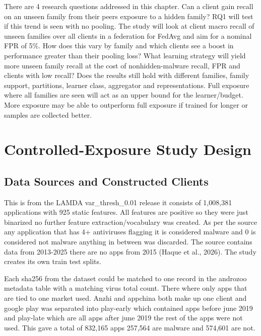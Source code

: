\documentclass[12pt,letterpaper]{article}
\begin{document}
There are 4 research questions addressed in this chapter. Can a client gain recall on an unseen family from their peers exposure to a hidden family? RQ1 will test if this trend is seen with no pooling. The study will look at client macro recall of unseen families over all clients in a federation for FedAvg and aim for a nominal FPR of 5\%. How does this vary by family and which clients see a boost in performance greater than their pooling loss? What learning strategy will yield more unseen family recall at the cost of nonhidden-malware recall, FPR and clients with low recall? Does the results still hold with different families, family support, partitions, learner class, aggregator and representations. Full exposure where all families are seen will act as an upper bound for the learner/budget. More exposure may be able to outperform full exposure if trained for longer or samples are collected better.

\section*{Controlled-Exposure Study Design}

\subsection*{Data Sources and Constructed Clients}

This is from the LAMDA var\_thresh\_0.01 release it consists of 1,008,381 applications with 925 static features. All features are positive so they were just binarized no further feature extraction/vocabulary was created. As per the source any application that has 4+ antiviruses flagging it is considered malware and 0 is considered not malware anything in between was discarded. The source contains data from 2013-2025 there are no apps from 2015 (Haque et al., 2026). The study creates its own train test splits. 

Each sha256 from the dataset could be matched to one record in the androzoo metadata table with a matching virus total count. There where only apps that are tied to one market used. Anzhi and appchina both make up one client and google play was separated into play-early which contained apps before june 2019 and play-late which are all apps after june 2019 the rest of the apps were not used. This gave a total of 832,165 apps 257,564 are malware and 574,601 are not.
\end{document}
